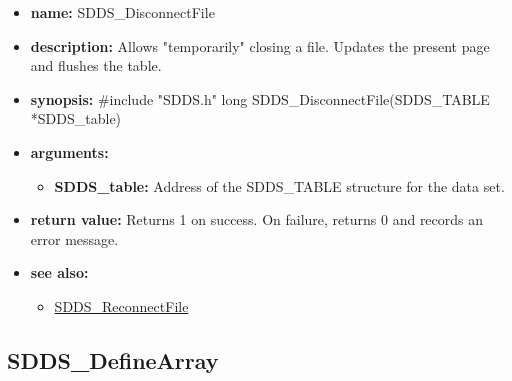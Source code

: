 \documentclass[11pt]{article}
\newcommand{\progref}[1]{\hyperref{SDDS_#1}{{\tt SDDS\_#1} (}{)}{SDDS_#1}}
\begin{document}
\begin{itemize}
\item {\bf name:}\newline
SDDS\_DisconnectFile
\item {\bf description:}\newline
Allows "temporarily" closing a file. Updates the present page and flushes the table.
\item {\bf synopsis:} \#include "SDDS.h"\newline
long SDDS\_DisconnectFile(SDDS\_TABLE *SDDS\_table)
\item {\bf arguments:}
\begin{itemize}
\item {\bf SDDS\_table:} Address of the SDDS\_TABLE structure for the data set.
\end{itemize}
\item {\bf return value:}\newline
Returns 1 on success. On failure, returns 0 and records an error message.
\item {\bf see also:}
\begin{itemize}
\item \progref{ReconnectFile}
\end{itemize}
\end{itemize}

\subsection{SDDS\_DefineArray}
\label{SDDS_DefineArray}
\end{document}
